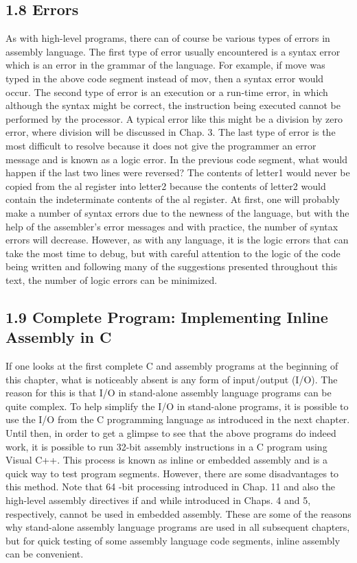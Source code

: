 \documentclass[10pt]{book}
\begin{document}
\subsection*{1.8 Errors}
As with high-level programs, there can of course be various types of errors in assembly language. The first type of error usually encountered is a syntax error which is an error in the grammar of the language. For example, if move was typed in the above code segment instead of mov, then a syntax error would occur. The second type of error is an execution or a run-time error, in which although the syntax might be correct, the instruction being executed cannot be performed by the processor. A typical error like this might be a division by zero error, where division will be discussed in Chap. 3. The last type of error is the most difficult to resolve because it does not give the programmer an error message and is known as a logic error. In the previous code segment, what would happen if the last two lines were reversed? The contents of letter1 would never be copied from the al register into letter2 because the contents of letter2 would contain the indeterminate contents of the al register. At first, one will probably make a number of syntax errors due to the newness of the language, but with the help of the assembler's error messages and with practice, the number of syntax errors will decrease. However, as with any language, it is the logic errors that can take the most time to debug, but with careful attention to the logic of the code being written and following many of the suggestions presented throughout this text, the number of logic errors can be minimized.

\subsection*{1.9 Complete Program: Implementing Inline Assembly in C}
If one looks at the first complete C and assembly programs at the beginning of this chapter, what is noticeably absent is any form of input/output (I/O). The reason for this is that I/O in stand-alone assembly language programs can be quite complex. To help simplify the I/O in stand-alone programs, it is possible to use the I/O from the C programming language as introduced in the next chapter. Until then, in order to get a glimpse to see that the above programs do indeed work, it is possible to run 32-bit assembly instructions in a C program using Visual C++. This process is known as inline or embedded assembly and is a quick way to test program segments. However, there are some disadvantages to this method. Note that 64 -bit processing introduced in Chap. 11 and also the high-level assembly directives if and while introduced in Chaps. 4 and 5, respectively, cannot be used in embedded assembly. These are some of the reasons why stand-alone assembly language programs are used in all subsequent chapters, but for quick testing of some assembly language code segments, inline assembly can be convenient.
\end{document}
